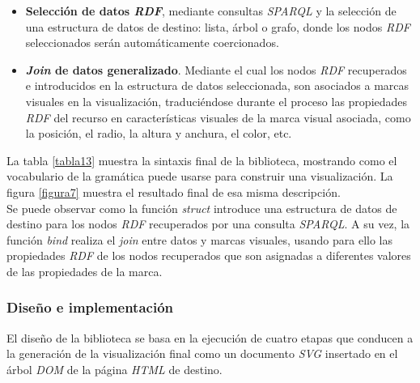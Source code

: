 \begin{itemize}
\item \textbf{Selecci\'on de datos \textit{RDF}}, mediante consultas \textit{SPARQL} y la selecci\'on de una estructura de datos de destino: lista, \'arbol o grafo, donde los nodos \textit{RDF} seleccionados ser\'an autom\'aticamente coercionados.
\item \textbf{\textit{Join} de datos generalizado}. Mediante el cual los nodos \textit{RDF} recuperados e introducidos en la estructura de datos seleccionada, son asociados a marcas visuales en la visualizaci\'on, traduci\'endose durante el proceso las propiedades \textit{RDF} del recurso en caracter\'isticas visuales de la marca visual asociada, como la posici\'on, el radio, la altura y anchura, el color, etc.
\end{itemize}

La tabla \ref{tabla13} muestra la sintaxis final de la biblioteca, mostrando como el vocabulario de la gram\'atica puede usarse para construir una visualizaci\'on. La figura \ref{figura7} muestra el resultado final de esa misma descripci\'on.\\
Se puede observar como la funci\'on \textit{struct} introduce una estructura de datos de destino para los nodos \textit{RDF} recuperados por una consulta \textit{SPARQL}. A su vez, la funci\'on \textit{bind} realiza el \textit{join} entre datos y marcas visuales, usando para ello las propiedades \textit{RDF} de los nodos recuperados que son asignadas a diferentes valores de las propiedades de la marca.

\subsubsection{Dise\~no e implementaci\'on}

El dise\~no de la biblioteca se basa en la ejecuci\'on de cuatro etapas que conducen a la generaci\'on de la visualizaci\'on final como un documento \textit{SVG} insertado en el \'arbol \textit{DOM} de la p\'agina \textit{HTML} de destino.

